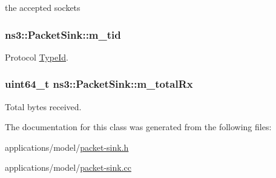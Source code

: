 the accepted sockets 

\subsubsection[{\texorpdfstring{m\+\_\+tid}{m_tid}}]{ ns3\+::\+Packet\+Sink\+::m\+\_\+tid\hspace{0.3cm}{\ttfamily [private]}}\hypertarget{classns3_1_1PacketSink_a1988cd4eb565f1e5ac6fd21beedf0563}{}\label{classns3_1_1PacketSink_a1988cd4eb565f1e5ac6fd21beedf0563}


Protocol \hyperlink{classns3_1_1TypeId}{Type\+Id}. 

\subsubsection[{\texorpdfstring{m\+\_\+total\+Rx}{m_totalRx}}]{\setlength{\rightskip}{0pt plus 5cm}uint64\+\_\+t ns3\+::\+Packet\+Sink\+::m\+\_\+total\+Rx\hspace{0.3cm}{\ttfamily [private]}}\hypertarget{classns3_1_1PacketSink_aa0e0c557f09ac820ca13b5a500600bd1}{}\label{classns3_1_1PacketSink_aa0e0c557f09ac820ca13b5a500600bd1}


Total bytes received. 



The documentation for this class was generated from the following files\+:\begin{DoxyCompactItemize}
\item 
applications/model/\hyperlink{packet-sink_8h}{packet-\/sink.\+h}\item 
applications/model/\hyperlink{packet-sink_8cc}{packet-\/sink.\+cc}\end{DoxyCompactItemize}
